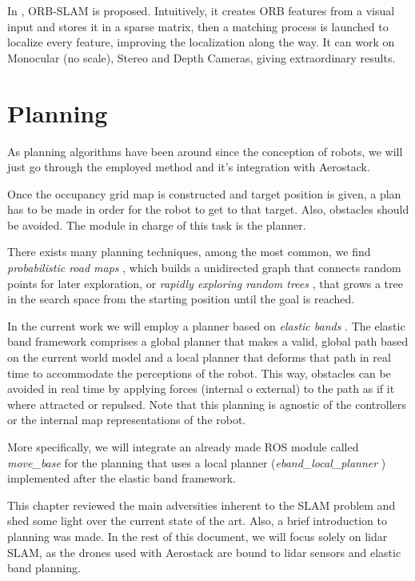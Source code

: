       In \cite{murTRO2015}, ORB-SLAM is proposed. Intuitively, it creates ORB features from a visual input and stores it in a sparse matrix, then a matching process is launched to localize every feature, improving the localization along the way. It can work on Monocular (no scale), Stereo and Depth Cameras, giving extraordinary results.

  \section{Planning} \label{ch_3:sect:planning}

    As planning algorithms have been around since the conception of robots, we will just go through the employed method and it's integration with Aerostack.

    Once the occupancy grid map is constructed and target position is given, a plan has to be made in order for the robot to get to that target. Also, obstacles should be avoided. The module in charge of this task is the planner.

    There exists many planning techniques, among the most common, we find \textit{probabilistic road maps} \cite{probabilistic_rmaps}, which builds a unidirected graph that connects random points for later exploration, or \textit{rapidly exploring random trees} \cite{rapidly_exp_rand_trees}, that grows a tree in the search space from the starting position until the goal is reached. 

    In the current work we will employ a planner based on \textit{elastic bands} \cite{eband}. The elastic band framework comprises a global planner that makes a valid, global path based on the current world model and a local planner that deforms that path in real time to accommodate the perceptions of the robot. This way, obstacles can be avoided in real time by applying forces (internal o external) to the path as if it where attracted or repulsed. Note that this planning is agnostic of the controllers or the internal map representations of the robot.

    More specifically, we will integrate an already made ROS module called \textit{move\_base} \cite{move_base_web} for the planning that uses a local planner (\textit{eband\_local\_planner} \cite{eband_planner_web}) implemented after the elastic band framework.

  This chapter reviewed the main adversities inherent to the SLAM problem and shed some light over the current state of the art. Also, a brief introduction to planning was made. In the rest of this document, we will focus solely on lidar SLAM, as the drones used with Aerostack are bound to lidar sensors and elastic band planning.


